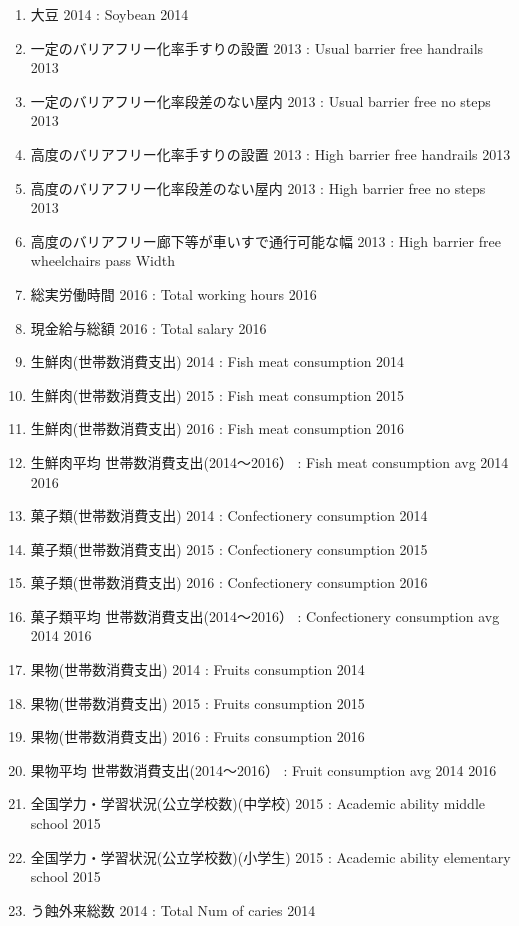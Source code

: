 \begin{multicols}{2}
\begin{enumerate}
  \item 大豆 2014  :  Soybean 2014
  \item 一定のバリアフリー化率手すりの設置 2013  :  Usual barrier free handrails 2013
  \item 一定のバリアフリー化率段差のない屋内 2013  :  Usual barrier free no steps 2013
  \item 高度のバリアフリー化率手すりの設置 2013  :  High barrier free handrails 2013
  \item 高度のバリアフリー化率段差のない屋内 2013  :  High barrier free no steps 2013
  \item 高度のバリアフリー廊下等が車いすで通行可能な幅 2013  :  High barrier free wheelchairs pass Width
  \item 総実労働時間 2016  :  Total working hours 2016
  \item 現金給与総額 2016  :  Total salary 2016
  \item 生鮮肉(世帯数消費支出) 2014  :  Fish meat consumption 2014
  \item 生鮮肉(世帯数消費支出) 2015  :  Fish meat consumption 2015
  \item 生鮮肉(世帯数消費支出) 2016  :  Fish meat consumption 2016
  \item 生鮮肉平均 世帯数消費支出(2014〜2016）  :  Fish meat consumption avg 2014 2016
  \item 菓子類(世帯数消費支出) 2014  :  Confectionery consumption 2014
  \item 菓子類(世帯数消費支出) 2015  :  Confectionery consumption 2015
  \item 菓子類(世帯数消費支出) 2016  :  Confectionery consumption 2016
  \item 菓子類平均 世帯数消費支出(2014〜2016）  :  Confectionery consumption avg 2014 2016
  \item 果物(世帯数消費支出) 2014  :  Fruits consumption 2014
  \item 果物(世帯数消費支出) 2015  :  Fruits consumption 2015
  \item 果物(世帯数消費支出) 2016  :  Fruits consumption 2016
  \item 果物平均 世帯数消費支出(2014〜2016）  :  Fruit consumption avg 2014 2016
  \item 全国学力・学習状況(公立学校数)(中学校) 2015  :  Academic ability middle school 2015
  \item 全国学力・学習状況(公立学校数)(小学生) 2015  :  Academic ability elementary school 2015
  \item う蝕外来総数 2014  :  Total Num of caries 2014

\end{enumerate}
\end{multicols}
